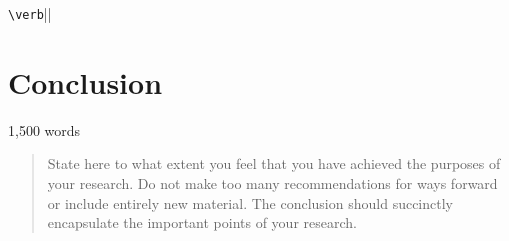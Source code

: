\verb|\verb|||\section{Conclusion}
1,500 words 

\begin{quote}
State here to what extent you feel that you have achieved the purposes of your research. Do not make too many recommendations for ways forward or include entirely new material. The conclusion should succinctly encapsulate the important points of your research.
\end{quote}